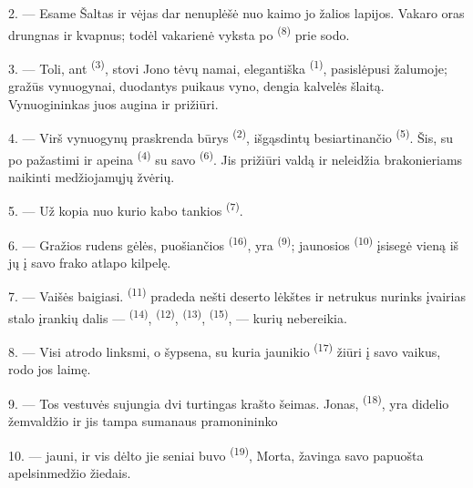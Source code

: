 2. --- Esame   Šaltas  ir
 vėjas dar nenuplėšė nuo kaimo jo žalios lapijos. Vakaro oras
drungnas ir kvapnus; todėl vakarienė vyksta po  \textsuperscript{(8)}
prie sodo.

3. --- Toli, ant  \textsuperscript{(3)}, stovi Jono tėvų namai,
elegantiška  \textsuperscript{(1)}, pasislėpusi žalumoje; gražūs
vynuogynai, duodantys puikaus vyno, dengia kalvelės šlaitą. Vynuogininkas juos
augina ir prižiūri.

4. --- Virš vynuogynų praskrenda būrys  \textsuperscript{(2)},
išgąsdintų besiartinančio  \textsuperscript{(5)}. Šis, su
 po pažastimi ir  apeina
 \textsuperscript{(4)} su savo  \textsuperscript{(6)}.
Jis prižiūri valdą ir neleidžia brakonieriams naikinti medžiojamųjų žvėrių.

5. --- Už  kopia  nuo kurio kabo tankios
 \textsuperscript{(7)}.

6. --- Gražios rudens gėlės, puošiančios  \textsuperscript{(16)}, yra
 \textsuperscript{(9)}; jaunosios 
\textsuperscript{(10)} įsisegė vieną iš jų į savo frako atlapo kilpelę.

7. --- Vaišės baigiasi.  \textsuperscript{(11)} pradeda nešti deserto
lėkštes ir netrukus nurinks įvairias stalo įrankių dalis --- 
\textsuperscript{(14)},  \textsuperscript{(12)}, 
\textsuperscript{(13)},  \textsuperscript{(15)}, --- kurių nebereikia.

\VUsaut{3.0mm}

8. --- Visi atrodo linksmi, o šypsena, su kuria jaunikio 
\textsuperscript{(17)} žiūri į savo vaikus, rodo jos laimę.

9. --- Tos vestuvės sujungia dvi turtingas krašto šeimas. Jonas, 
\textsuperscript{(18)}, yra didelio žemvaldžio  ir jis tampa sumanaus
pramonininko 

10. ---  jauni, ir vis dėlto jie seniai buvo
  \textsuperscript{(19)}, Morta, žavinga
savo  papuošta apelsinmedžio žiedais.


